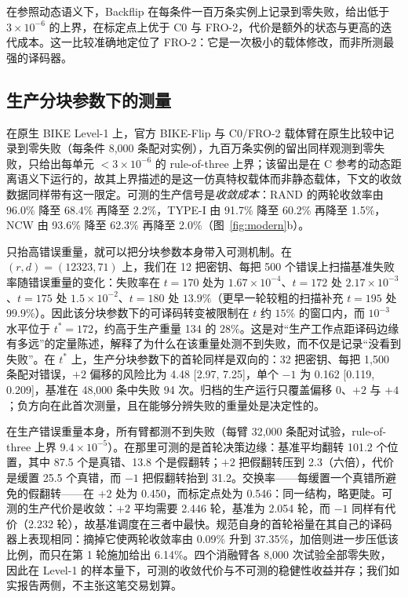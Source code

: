 \documentclass[UTF8,a4paper,10pt,twocolumn]{ctexart}
\begin{document}
在参照动态语义下，Backflip 在每条件一百万条实例上记录到零失败，给出低于 $3\times10^{-6}$ 的上界，在标定点上优于 C0 与 FRO-2，代价是额外的状态与更高的迭代成本。这一比较准确地定位了 FRO-2：它是一次极小的载体修改，而非所测最强的译码器。

\subsection{生产分块参数下的测量}\label{sec:production}

在原生 BIKE Level-1 上，官方 BIKE-Flip 与 C0/FRO-2 载体臂在原生比较中记录到零失败（每条件 8{,}000 条配对实例），九百万条实例的留出同样观测到零失败，只给出每单元 $<3\times10^{-6}$ 的 rule-of-three 上界；该留出是在 C 参考的动态距离语义下运行的，故其上界描述的是这一仿真特权载体而非静态载体，下文的收敛数据同样带有这一限定。可测的生产信号是\emph{收敛成本}：RAND 的两轮收敛率由 96.0\% 降至 68.4\% 再降至 2.2\%，TYPE-I 由 91.7\% 降至 60.2\% 再降至 1.5\%，NCW 由 93.6\% 降至 62.3\% 再降至 2.0\%（图~\ref{fig:modern}b）。

只抬高错误重量，就可以把分块参数本身带入可测机制。在 $(r,d)=(12323,71)$ 上，我们在 12 把密钥、每把 500 个错误上扫描基准失败率随错误重量的变化：失败率在 $t=170$ 处为 $1.67\times10^{-4}$、$t=172$ 处 $2.17\times10^{-3}$、$t=175$ 处 $1.5\times10^{-2}$、$t=180$ 处 $13.9\%$（更早一轮较粗的扫描补充 $t=195$ 处 99.9\%）。因此该分块参数下的可译码转变被限制在 $t$ 约 $15\%$ 的窗口内，而 $10^{-3}$ 水平位于 $t^{\ast}=172$，约高于生产重量 134 的 $28\%$。这是对“生产工作点距译码边缘有多远”的定量陈述，解释了为什么在该重量处测不到失败，而不仅是记录“没看到失败”。在 $t^{\ast}$ 上，生产分块参数下的首轮同样是双向的：32 把密钥、每把 1{,}500 条配对错误，$+2$ 偏移的风险比为 4.48 [2.97, 7.25]，单个 $-1$ 为 0.162 [0.119, 0.209]，基准在 48{,}000 条中失败 94 次。归档的生产运行只覆盖偏移 $0$、$+2$ 与 $+4$；负方向在此首次测量，且在能够分辨失败的重量处是决定性的。

在生产错误重量本身，所有臂都测不到失败（每臂 32{,}000 条配对试验，rule-of-three 上界 $9.4\times10^{-5}$）。在那里可测的是首轮决策边缘：基准平均翻转 101.2 个位置，其中 87.5 个是真错、13.8 个是假翻转；$+2$ 把假翻转压到 2.3（六倍），代价是缓置 25.5 个真错，而 $-1$ 把假翻转抬到 31.2。交换率——每缓置一个真错所避免的假翻转——在 $+2$ 处为 0.450，而标定点处为 0.546：同一结构，略更陡。可测的生产代价是收敛：$+2$ 平均需要 2.446 轮，基准为 2.054 轮，而 $-1$ 同样有代价（2.232 轮），故基准调度在三者中最快。规范自身的首轮裕量在其自己的译码器上表现相同：摘掉它使两轮收敛率由 0.09\% 升到 37.35\%，加倍则进一步压低该比例，而只在第 1 轮施加给出 6.14\%。四个消融臂各 8{,}000 次试验全部零失败，因此在 Level-1 的样本量下，可测的收敛代价与不可测的稳健性收益并存；我们如实报告两侧，不主张这笔交易划算。
\end{document}
